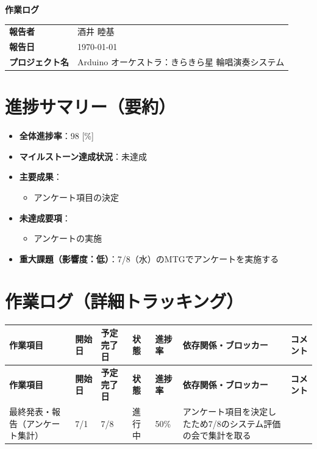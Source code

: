 \documentclass[a4paper,12pt]{ltjsarticle}
\begin{document}
\begin{center}
  {\LARGE\bfseries 作業ログ}
\end{center}

\vspace{4mm}

\begin{tabular}{ll}
  \textbf{報告者} & 酒井 睦基 \\
  \textbf{報告日} & \today \\
  \textbf{プロジェクト名} & Arduino オーケストラ：きらきら星 輪唱演奏システム \\
\end{tabular}

\vspace{6mm}

\section{進捗サマリー（要約）}

\begin{itemize}
  \item \textbf{全体進捗率}：98 [\%]
  \item \textbf{マイルストーン達成状況}：未達成
  \item \textbf{主要成果}：
    \begin{itemize}
      \item アンケート項目の決定
    \end{itemize}
  \item \textbf{未達成要項}：
    \begin{itemize}
      \item アンケートの実施
    \end{itemize}
  \item \textbf{重大課題（影響度：低）}：7/8（水）のMTGでアンケートを実施する
\end{itemize}

\section{作業ログ（詳細トラッキング）}

\begin{longtable}{C{2cm}C{1.6cm}C{1.6cm}C{2.2cm}C{1.2cm}L{2.4cm}L{3cm}}
  \toprule
  \textbf{作業項目} & \textbf{開始日} & \textbf{予定完了日} & \textbf{状態} & \textbf{進捗率} & \textbf{依存関係・ブロッカー} & \textbf{コメント} \\
  \midrule
  \endfirsthead
  \toprule
  \textbf{作業項目} & \textbf{開始日} & \textbf{予定完了日} & \textbf{状態} & \textbf{進捗率} & \textbf{依存関係・ブロッカー} & \textbf{コメント} \\
  \midrule
  \endhead
  \midrule
  \endfoot
  \bottomrule
  \endlastfoot
  最終発表・報告（アンケート集計） & 7/1 & 7/8 & 進行中 & 50\% & アンケート項目を決定したため7/8のシステム評価の会で集計を取る & \\
\end{longtable}
\end{document}
